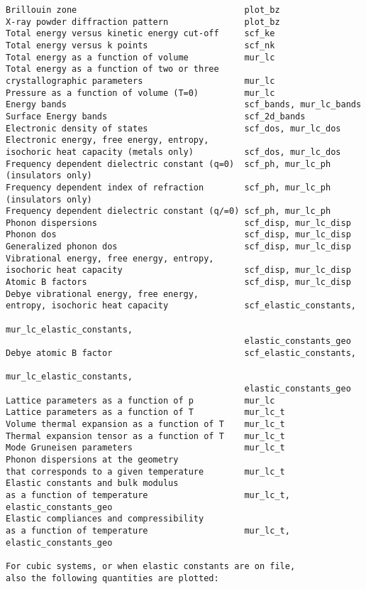 \documentclass[12pt,a4paper,twoside]{report}
\begin{document}
\begin{footnotesize}
\begin{verbatim}
Brillouin zone                                 plot_bz
X-ray powder diffraction pattern               plot_bz
Total energy versus kinetic energy cut-off     scf_ke
Total energy versus k points                   scf_nk
Total energy as a function of volume           mur_lc
Total energy as a function of two or three
crystallographic parameters                    mur_lc
Pressure as a function of volume (T=0)         mur_lc
Energy bands                                   scf_bands, mur_lc_bands
Surface Energy bands                           scf_2d_bands
Electronic density of states                   scf_dos, mur_lc_dos
Electronic energy, free energy, entropy,      
isochoric heat capacity (metals only)          scf_dos, mur_lc_dos
Frequency dependent dielectric constant (q=0)  scf_ph, mur_lc_ph
(insulators only)
Frequency dependent index of refraction        scf_ph, mur_lc_ph
(insulators only)
Frequency dependent dielectric constant (q/=0) scf_ph, mur_lc_ph
Phonon dispersions                             scf_disp, mur_lc_disp
Phonon dos                                     scf_disp, mur_lc_disp
Generalized phonon dos                         scf_disp, mur_lc_disp
Vibrational energy, free energy, entropy,      
isochoric heat capacity                        scf_disp, mur_lc_disp
Atomic B factors                               scf_disp, mur_lc_disp
Debye vibrational energy, free energy, 
entropy, isochoric heat capacity               scf_elastic_constants, 
                                               mur_lc_elastic_constants,
                                               elastic_constants_geo
Debye atomic B factor                          scf_elastic_constants,
                                               mur_lc_elastic_constants,
                                               elastic_constants_geo
Lattice parameters as a function of p          mur_lc
Lattice parameters as a function of T          mur_lc_t
Volume thermal expansion as a function of T    mur_lc_t 
Thermal expansion tensor as a function of T    mur_lc_t 
Mode Gruneisen parameters                      mur_lc_t
Phonon dispersions at the geometry 
that corresponds to a given temperature        mur_lc_t
Elastic constants and bulk modulus
as a function of temperature                   mur_lc_t, elastic_constants_geo
Elastic compliances and compressibility
as a function of temperature                   mur_lc_t, elastic_constants_geo

For cubic systems, or when elastic constants are on file,
also the following quantities are plotted:


\end{verbatim}
\end{footnotesize}
\end{document}
